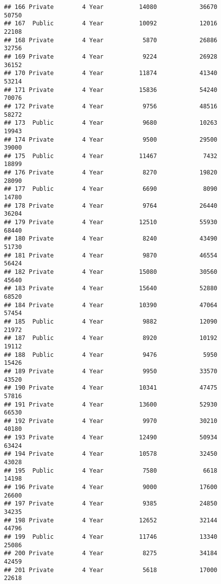 \documentclass[
]{article}
\begin{document}
\begin{verbatim}
## 166 Private        4 Year          14080            36670          50750
## 167  Public        4 Year          10092            12016          22108
## 168 Private        4 Year           5870            26886          32756
## 169 Private        4 Year           9224            26928          36152
## 170 Private        4 Year          11874            41340          53214
## 171 Private        4 Year          15836            54240          70076
## 172 Private        4 Year           9756            48516          58272
## 173  Public        4 Year           9680            10263          19943
## 174 Private        4 Year           9500            29500          39000
## 175  Public        4 Year          11467             7432          18899
## 176 Private        4 Year           8270            19820          28090
## 177  Public        4 Year           6690             8090          14780
## 178 Private        4 Year           9764            26440          36204
## 179 Private        4 Year          12510            55930          68440
## 180 Private        4 Year           8240            43490          51730
## 181 Private        4 Year           9870            46554          56424
## 182 Private        4 Year          15080            30560          45640
## 183 Private        4 Year          15640            52880          68520
## 184 Private        4 Year          10390            47064          57454
## 185  Public        4 Year           9882            12090          21972
## 187  Public        4 Year           8920            10192          19112
## 188  Public        4 Year           9476             5950          15426
## 189 Private        4 Year           9950            33570          43520
## 190 Private        4 Year          10341            47475          57816
## 191 Private        4 Year          13600            52930          66530
## 192 Private        4 Year           9970            30210          40180
## 193 Private        4 Year          12490            50934          63424
## 194 Private        4 Year          10578            32450          43028
## 195  Public        4 Year           7580             6618          14198
## 196 Private        4 Year           9000            17600          26600
## 197 Private        4 Year           9385            24850          34235
## 198 Private        4 Year          12652            32144          44796
## 199  Public        4 Year          11746            13340          25086
## 200 Private        4 Year           8275            34184          42459
## 201 Private        4 Year           5618            17000          22618

\end{verbatim}
\end{document}
